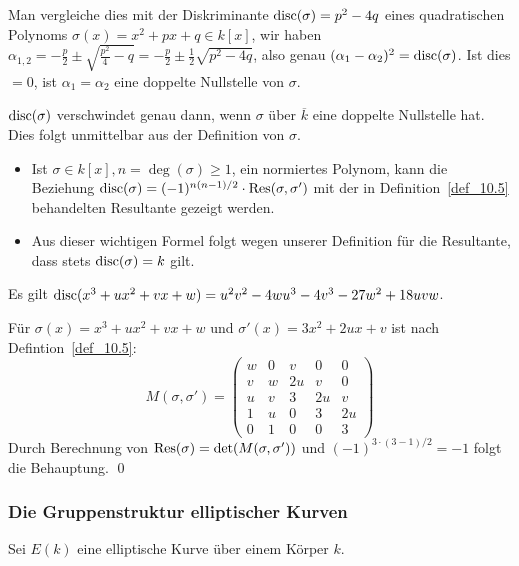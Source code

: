 \begin{bem}
	Man vergleiche dies mit der Diskriminante $\operatorname{disc}(\sigma) = p^2-4q$ eines quadratischen Polynoms $\sigma(x) = x^2+px+q \in k[x]$, wir haben $\alpha_{1,2} = -\frac{p}{2} \pm \sqrt{\frac{p^2}{4} - q} = -\frac{p}{2} \pm \frac{1}{2} \sqrt{p^2 -4q}$, also genau $(\alpha_1 - \alpha_2)^2 = \operatorname{disc}(\sigma)$. 
	Ist dies $=0$, ist $\alpha_1 = \alpha_2$ eine doppelte Nullstelle von $\sigma$.
\end{bem}

\begin{bem}
\label{bem_12.14}
	$\operatorname{disc}(\sigma)$ verschwindet genau dann, wenn $\sigma$ über $\overline{k}$ eine doppelte Nullstelle hat. 
	Dies folgt unmittelbar aus der Definition von $\sigma$.
\end{bem}

\begin{bem}
\label{bem_12.15}
	\begin{itemize}
		\item Ist $\sigma \in k[x], n = \deg(\sigma) \geq 1$, ein normiertes Polynom, kann die Beziehung $\operatorname{disc}(\sigma) = (-1)^{n(n-1)/2} \cdot \operatorname{Res}(\sigma, \sigma')$ mit der in Definition~\ref{def_10.5} behandelten Resultante gezeigt werden.
		\item Aus dieser wichtigen Formel folgt wegen unserer Definition für die Resultante, dass stets $\operatorname{disc}(\sigma) = k$ gilt.
	\end{itemize}
\end{bem}

\begin{kor}
\label{kor_12.16}
	Es gilt $\operatorname{disc}(x^3+ux^2+vx+w) = u^2v^2 - 4wu^3 - 4v^3 - 27w^2 + 18uvw$. 
\end{kor}

	Für $\sigma(x) = x^3 + ux^2 + vx + w$ und $\sigma'(x) = 3x^2+2ux+v$ ist nach Defintion~\ref{def_10.5}: 
	\[ M(\sigma,\sigma') = \begin{pmatrix}
	w & 0 & v & 0 & 0 \\ 
	v & w & 2u & v & 0 \\ 
	u & v & 3 & 2u & v \\ 
	1 & u & 0 & 3 & 2u \\ 
	0 & 1 & 0 & 0 & 3
	\end{pmatrix} \]
	Durch Berechnung von $\operatorname{Res}(\sigma) = \det(M(\sigma,\sigma'))$ und $(-1)^{3 \cdot (3-1)/2} = -1$ folgt die Behauptung. \qed
	
\nextlecture
\subsubsection{Die Gruppenstruktur elliptischer Kurven}
	Sei $E(k)$ eine elliptische Kurve über einem Körper $k$. 
	\marginnote{[13]}
	
